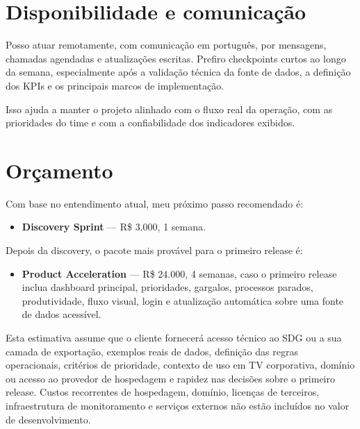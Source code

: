 \documentclass[11pt,a4paper]{article}
\begin{document}
\section*{Disponibilidade e comunicação}

Posso atuar remotamente, com comunicação em português, por mensagens, chamadas agendadas e atualizações escritas. Prefiro checkpoints curtos ao longo da semana, especialmente após a validação técnica da fonte de dados, a definição dos KPIs e os principais marcos de implementação.\par

Isso ajuda a manter o projeto alinhado com o fluxo real da operação, com as prioridades do time e com a confiabilidade dos indicadores exibidos.\par

\section*{Orçamento}

Com base no entendimento atual, meu próximo passo recomendado é:\par

\begin{itemize}
\item \textbf{Discovery Sprint} --- R\$ 3.000, 1 semana.
\end{itemize}

Depois da discovery, o pacote mais provável para o primeiro release é:\par

\begin{itemize}
\item \textbf{Product Acceleration} --- R\$ 24.000, 4 semanas, caso o primeiro release inclua dashboard principal, prioridades, gargalos, processos parados, produtividade, fluxo visual, login e atualização automática sobre uma fonte de dados acessível.
\end{itemize}

Esta estimativa assume que o cliente fornecerá acesso técnico ao SDG ou a sua camada de exportação, exemplos reais de dados, definição das regras operacionais, critérios de prioridade, contexto de uso em TV corporativa, domínio ou acesso ao provedor de hospedagem e rapidez nas decisões sobre o primeiro release. Custos recorrentes de hospedagem, domínio, licenças de terceiros, infraestrutura de monitoramento e serviços externos não estão incluídos no valor de desenvolvimento.\par
\end{document}

